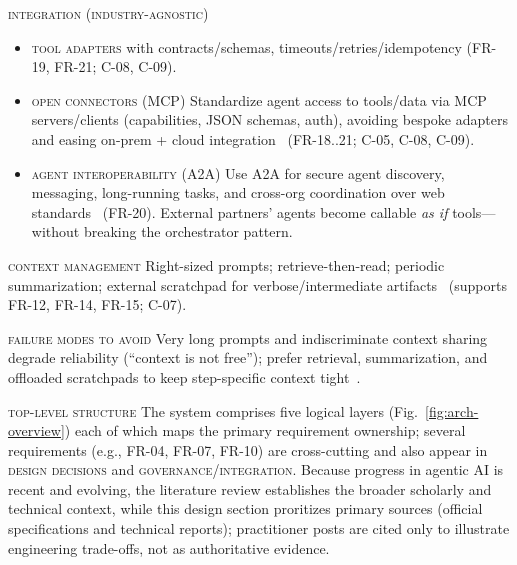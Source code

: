 \noindent \textsc{integration (industry-agnostic)}
\begin{itemize}
  \item \textsc{tool adapters} with contracts/schemas, timeouts/retries/idempotency (\textsc{FR-19, FR-21; C-08, C-09}).
  \item \textsc{open connectors (MCP)} Standardize agent access to tools/data via MCP servers/clients (capabilities, JSON schemas, auth), avoiding bespoke adapters and easing on-prem + cloud integration~\parencite{anthropic_mcp} (\textsc{FR-18..21; C-05, C-08, C-09}).
  \item \textsc{agent interoperability (A2A)} Use A2A for secure agent discovery, messaging, long-running tasks, and cross-org coordination over web standards\ \parencite{google_a2a} (\textsc{FR-20}). External partners' agents become callable \emph{as if} tools—without breaking the orchestrator pattern.
\end{itemize}

\noindent \textsc{context management} \quad Right-sized prompts; retrieve-then-read; periodic summarization; external scratchpad for verbose/intermediate artifacts~\parencite{breunig_context_fail,breunig_fix_context} (supports \textsc{FR-12, FR-14, FR-15; C-07}).

\noindent \textsc{failure modes to avoid} \quad Very long prompts and indiscriminate context sharing degrade reliability (\enquote{context is not free}); prefer retrieval, summarization, and offloaded scratchpads to keep step-specific context tight~\parencite{breunig_context_fail,breunig_fix_context}.


\textsc{top-level structure} \quad The system comprises five logical layers (Fig.~\ref{fig:arch-overview}) each of which maps the primary requirement ownership; several requirements (e.g., \textsc{FR-04, FR-07, FR-10}) are cross-cutting and also appear in \textsc{design decisions} and \textsc{governance/integration}. Because progress in agentic AI is recent and evolving, the literature review establishes the broader scholarly and technical context, while this design section proritizes primary sources (official specifications and technical reports); practitioner posts are cited only to illustrate engineering trade-offs, not as authoritative evidence.

